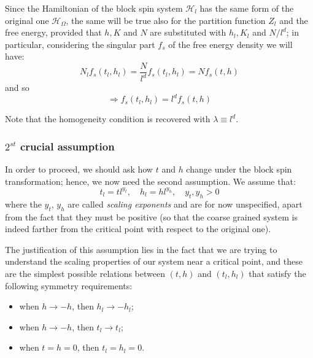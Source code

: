 \documentclass[../main/main.tex]{subfiles}
\begin{document}
Since the Hamiltonian of the block spin system \( \mathcal{H}_l \) has the same form of the original one \( \mathcal{H}_ \Omega  \), the same will be true also for the partition function \( Z_l \) and the free energy, provided that \( h,K \) and \( N \) are substituted with \( h_l,K_l \) and \( N/l^d \); in particular, considering the singular part \( f_s \) of the free energy density we will have:
\begin{equation*}
  N_l f_s (t_l,h_l)= \frac{N}{l^d} f_s (t_l,h_l) = N f_s (t,h)
\end{equation*}
and so
\begin{equation*}
  \Rightarrow  f_s (t_l,h_l) = l^d f_s (t,h)
\end{equation*}

\begin{remark}
Note that the homogeneity condition is recovered with \( \lambda \equiv l^d \).
\end{remark}


\subsubsection{\(  2^{st} \) crucial assumption}
In order to proceed, we should ask how \( t \) and \( h \) change under the block spin transformation; hence, we now need the second assumption. We assume that:
\begin{equation}
   t_l = t l^{y_t}, \quad   h_l = h l^{y_h}, \quad y_t,y_h >0
  \label{eq:19_8}
\end{equation}
where the \( y_t, \, y_h \) are called \emph{scaling exponents} and are for now unspecified, apart from the fact that they must be positive (so that the coarse grained system is indeed farther from the critical point with respect to the original one).

The justification of this assumption lies in the fact that we are trying to understand the scaling properties of our system near a critical point, and these are the simplest possible relations between \( (t,h) \) and \( (t_l,h_l) \) that satisfy the following symmetry requirements:
\begin{itemize}
\item when \( h \rightarrow -h \), then \( h_l \rightarrow -h_l \);
\item when \( h \rightarrow -h \), then \( t_l \rightarrow t_l \);
\item when \( t=h=0 \), then \( t_l=h_l=0 \).
\end{itemize}
\end{document}
